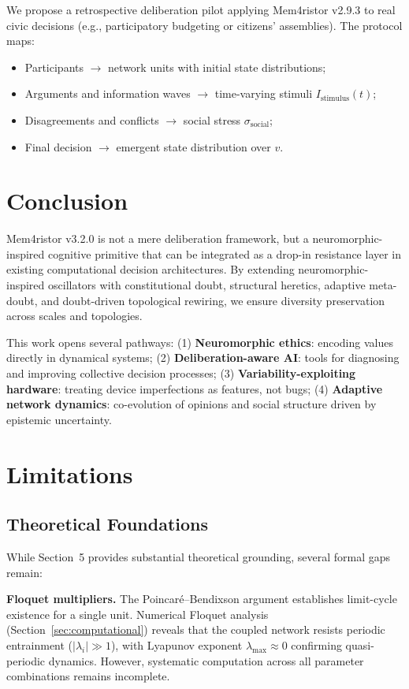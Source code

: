 \documentclass[11pt]{article}
\begin{document}
We propose a retrospective deliberation pilot applying Mem4ristor v2.9.3 to real civic decisions (e.g., participatory budgeting or citizens' assemblies). The protocol maps:
\begin{itemize}
\item Participants $\to$ network units with initial state distributions;
\item Arguments and information waves $\to$ time-varying stimuli $I_{\text{stimulus}}(t)$;
\item Disagreements and conflicts $\to$ social stress $\sigma_{\text{social}}$;
\item Final decision $\to$ emergent state distribution over $v$.
\end{itemize}

\section{Conclusion}

Mem4ristor v3.2.0 is not a mere deliberation framework, but a neuromorphic-inspired cognitive primitive that can be integrated as a drop-in resistance layer in existing computational decision architectures. By extending neuromorphic-inspired oscillators with constitutional doubt, structural heretics, adaptive meta-doubt, and doubt-driven topological rewiring, we ensure diversity preservation across scales and topologies.

This work opens several pathways: (1) \textbf{Neuromorphic ethics}: encoding values directly in dynamical systems; (2) \textbf{Deliberation-aware AI}: tools for diagnosing and improving collective decision processes; (3) \textbf{Variability-exploiting hardware}: treating device imperfections as features, not bugs; (4) \textbf{Adaptive network dynamics}: co-evolution of opinions and social structure driven by epistemic uncertainty.

\section{Limitations}

\subsection{Theoretical Foundations}

While Section~5 provides substantial theoretical grounding, several formal gaps remain:

\textbf{Floquet multipliers.} The Poincar\'e--Bendixson argument establishes limit-cycle existence for a single unit. Numerical Floquet analysis (Section~\ref{sec:computational}) reveals that the coupled network resists periodic entrainment ($|\lambda_i| \gg 1$), with Lyapunov exponent $\lambda_{\max} \approx 0$ confirming quasi-periodic dynamics. However, systematic computation across all parameter combinations remains incomplete.
\end{document}
